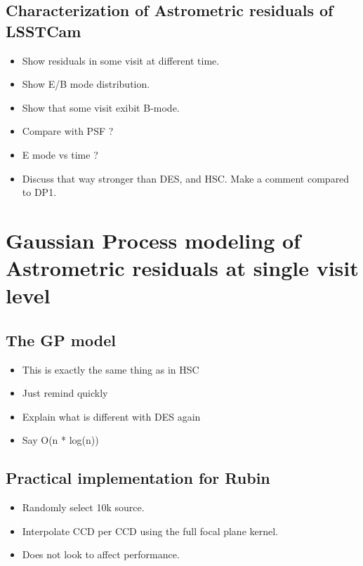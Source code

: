 \subsection{Characterization of Astrometric residuals of LSSTCam}

\begin{itemize}
    \item Show residuals in some visit at different time. 
    \item Show E/B mode distribution.
    \item Show that some visit exibit B-mode.
    \item Compare with PSF ?
    \item E mode vs time ?
    \item Discuss that way stronger than DES, and HSC. Make a comment compared to DP1.
\end{itemize}

\section{Gaussian Process modeling of Astrometric residuals at single visit level}


\subsection{The GP model}

\begin{itemize}
    \item This is exactly the same thing as in HSC
    \item Just remind quickly
    \item Explain what is different with DES again
    \item Say O(n * log(n))
\end{itemize}

\subsection{Practical implementation for Rubin}

\begin{itemize}
    \item Randomly select 10k source.
    \item Interpolate CCD per CCD using the full focal plane kernel.
    \item Does not look to affect performance.
\end{itemize}

